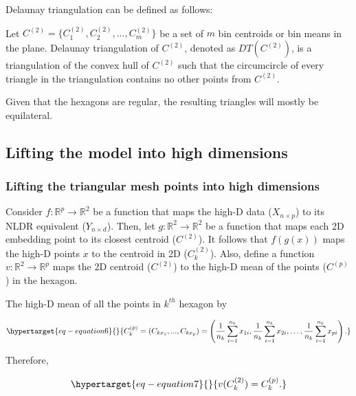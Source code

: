 \documentclass[
  12pt]{article}
\begin{document}
Delaunay triangulation can be defined as follows:

Let \(C^{(2)} = \{C_1^{(2)}, C_2^{(2)}, ..., C_m^{(2)}\}\) be a set of
\(m\) bin centroids or bin means in the plane. Delaunay triangulation of
\(C^{(2)}\), denoted as \(DT(C^{(2)})\), is a triangulation of the
convex hull of \(C^{(2)}\) such that the circumcircle of every triangle
in the triangulation contains no other points from \(C^{(2)}\).

Given that the hexagons are regular, the resulting triangles will mostly
be equilateral.

\hypertarget{lifting-the-model-into-high-dimensions}{%
\subsection{Lifting the model into high
dimensions}\label{lifting-the-model-into-high-dimensions}}

\hypertarget{lifting-the-triangular-mesh-points-into-high-dimensions}{%
\subsubsection{Lifting the triangular mesh points into high
dimensions}\label{lifting-the-triangular-mesh-points-into-high-dimensions}}

Consider \(f: \mathbb{R}^p \rightarrow \mathbb{R}^2\) be a function that
maps the high-D data (\(X_{n \times p}\)) to its NLDR equivalent
(\(Y_{n \times d}\)). Then, let
\(g: \mathbb{R}^2 \rightarrow \mathbb{R}^2\) be a function that maps
each 2D embedding point to its closest centroid (\(C^{(2)}\)). It
follows that \(f(g(x))\) maps the high-D points \(x\) to the centroid in
2D (\(C_k^{(2)}\)). Also, define a function
\(v: \mathbb{R}^2 \rightarrow \mathbb{R}^p\) maps the 2D centroid
(\(C^{(2)}\)) to the high-D mean of the points (\(C^{(p)}\)) in the
hexagon.

The high-D mean of all the points in \(k^{th}\) hexagon by

\begin{equation}\protect\hypertarget{eq-equation6}{}{
C_k^{(p)} = (C_{kx_1}, ..., C_{kx_p}) = \left(\frac{1}{n_k} \sum_{i=1}^{n_k} x_{1i}, \frac{1}{n_k} \sum_{i=1}^{n_k} x_{2i}, \dots ,\frac{1}{n_k} \sum_{i=1}^{n_k} x_{pi}\right).
}\label{eq-equation6}\end{equation}

Therefore,

\begin{equation}\protect\hypertarget{eq-equation7}{}{
v(C_k^{(2)}) = C_k^{(p)}.
}\label{eq-equation7}\end{equation}
\end{document}
